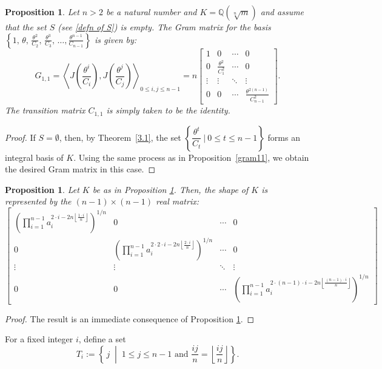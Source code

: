 \documentclass[table]{amsart}
\newtheorem{proposition}[theorem]{Proposition}
\newcommand{\Q}{\mathbb{Q}}
\numberwithin{equation}{section}
\begin{document}
\begin{proposition}\label{gen}
Let $n>2$ be a natural number and $K=\Q(\sqrt[n]{m})$ and assume that the set $S$ (see \eqref{defn of S}) is empty. The Gram matrix for the basis $\left\{ 1,\, \theta,\, \frac{\theta^2}{C_2},\, \frac{\theta^3}{C_3},\, \ldots,\frac{\theta^{n-1}}{C_{n-1}} \right\}$ is given by:
\[
G_{1,1} = \left\langle J\left(\frac{\theta^{i}}{C_i}\right), J\left(\frac{\theta^{j}}{C_j}\right) \right\rangle_{0 \leq i,j \leq n-1}
= 
n\begin{bmatrix}
1 & 0 & \cdots & 0 \\[8pt]
0 & \frac{\theta^2}{C_1^2} & \cdots & 0 \\[8pt]
\vdots & \vdots & \ddots & \vdots \\[8pt]
0 & 0 & \cdots & \frac{\theta^{2(n-1)}}{C_{n-1}^2}
\end{bmatrix}.
\]
The transition matrix $C_{1,1}$ is simply taken to be the identity.
\end{proposition}
\begin{proof}
   If \( S = \emptyset \), then, by Theorem~\ref{3.1}, the set \( \left\lbrace  \dfrac{\theta^t}{C_t } ~\bigg\vert~ 0 \leq t \leq n - 1 \right\rbrace \) forms an integral basis of \( K \). Using the same process as in Proposition~\ref{gram11}, we obtain the desired Gram matrix in this case.
\end{proof}

\begin{proposition} Let $K$ be as in Proposition \ref{gen}. Then, the shape of $K$ is represented by the $(n-1)\times (n-1)$ real matrix:
    \[
\begin{bmatrix}
\left(\prod\limits_{i=1}^{n-1} a_i^{2 \cdot i - 2n \left\lfloor \frac{1 \cdot i}{n} \right\rfloor}\right)^{1/n} & 0 & \cdots & 0 \\[8pt]
0 & \left(\prod\limits_{i=1}^{n-1} a_i^{2 \cdot 2 \cdot i - 2n \left\lfloor \frac{2 \cdot i}{n} \right\rfloor}\right)^{1/n} & \cdots & 0 \\[8pt]
\vdots & \vdots & \ddots & \vdots \\[8pt]
0 & 0 & \cdots & \left(\prod\limits_{i=1}^{n-1} a_i^{2 \cdot (n-1) \cdot i - 2n \left\lfloor \frac{(n-1) \cdot i}{n} \right\rfloor}\right)^{1/n}
\end{bmatrix}
\]
\end{proposition}

\begin{proof}
    The result is an immediate consequence of Proposition \ref{gen}.
\end{proof}
\par For a fixed integer $i$, define a set
\[
T_i := \left\{\, j \;\middle|\; 1 \leq j \leq n-1 \text{ and } \frac{i j}{n} = \left\lfloor \frac{i j}{n} \right\rfloor \right\}.
\] 
\end{document}

